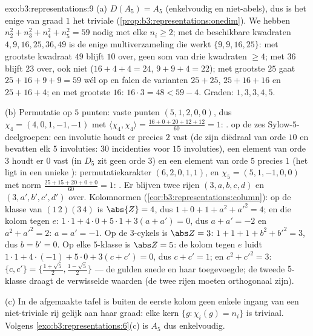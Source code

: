 \begin{solution}{exo:b3:representations:9}
(a) $D(A_5) = A_5$ (enkelvoudig en niet-abels), dus is het enige
 van graad $1$ het triviale
(\cref{prop:b3:representations:onedim}). We hebben $n_2^2 + n_3^2
+ n_4^2 + n_5^2 = 59$ nodig met elke $n_i \geq 2$; met de
beschikbare kwadraten $4, 9, 16, 25, 36, 49$ is de enige
multiverzameling die werkt $\{9, 9, 16, 25\}$: met grootste
kwadraat $49$ blijft $10$ over, geen som van drie kwadraten $\geq
4$; met $36$ blijft $23$ over, ook niet ($16 + 4 + 4 = 24$, $9 + 9
+ 4 = 22$); met grootste $25$ gaat $25 + 16 + 9 + 9 = 59$ wél op
en falen de varianten $25 + 25$, $25 + 16 + 16$ en $25 + 16 + 4$;
en met grootste $16$: $16\cdot3 = 48 < 59 - 4$. Graden: $1, 3, 3,
4, 5$.

(b) Permutatie op $5$ punten: vaste punten $(5, 1, 2, 0, 0)$, dus
$\chi_4 = (4, 0, 1, -1, -1)$ met $\langle\chi_4,\chi_4\rangle =
\frac{16 + 0 + 20 + 12 + 12}{60} = 1$: .  op de
zes Sylow-$5$-deelgroepen: een involutie houdt er precies $2$ vast
(de  zijn diëdraal van orde $10$ en bevatten elk $5$
involuties: $30$ incidenties voor $15$ involuties), een element
van orde $3$ houdt er $0$ vast (in $D_5$ zit geen orde $3$) en een
element van orde $5$ precies $1$ (het ligt in een unieke
): permutatiekarakter $(6, 2, 0, 1, 1)$, en $\chi_5
= (5, 1, -1, 0, 0)$ met norm $\frac{25 + 15 + 20 + 0 + 0}{60} =
1$: . Er blijven twee rijen $(3, a, b, c, d)$ en $(3,
a', b', c', d')$ over. Kolomnormen
(\cref{cor:b3:representations:column}): op de klasse van
$(1\,2)(3\,4)$ is $\abs{Z} = 4$, dus $1 + 0 + 1 + a^2 + a'^2 = 4$;
en die kolom tegen $e$: $1\cdot1 + 4\cdot 0 + 5\cdot1 + 3(a + a')
= 0$, dus $a + a' = -2$ en $a^2 + a'^2 = 2$: $a = a' = -1$. Op de
$3$-cykels is $\abs Z = 3$: $1 + 1 + 1 + b^2 + b'^2 = 3$, dus $b =
b' = 0$. Op elke $5$-klasse is $\abs Z = 5$: de kolom tegen $e$
luidt $1\cdot 1 + 4\cdot(-1) + 5\cdot 0 + 3(c + c') = 0$, dus $c +
c' = 1$; en $c^2 + c'^2 = 3$: $\{c, c'\} =
\bigl\{\frac{1+\sqrt5}2, \frac{1-\sqrt5}2\bigr\}$ --- de gulden
snede en haar toegevoegde; de tweede $5$-klasse draagt de
verwisselde waarden (de twee rijen moeten orthogonaal zijn).

(c) In de afgemaakte tafel is buiten de eerste kolom geen enkele
ingang van een niet-triviale rij gelijk aan haar graad: elke kern
$\{g : \chi_i(g) = n_i\}$ is triviaal. Volgens
\cref{exo:b3:representations:6}(c) is $A_5$ dus enkelvoudig.
\end{solution}

